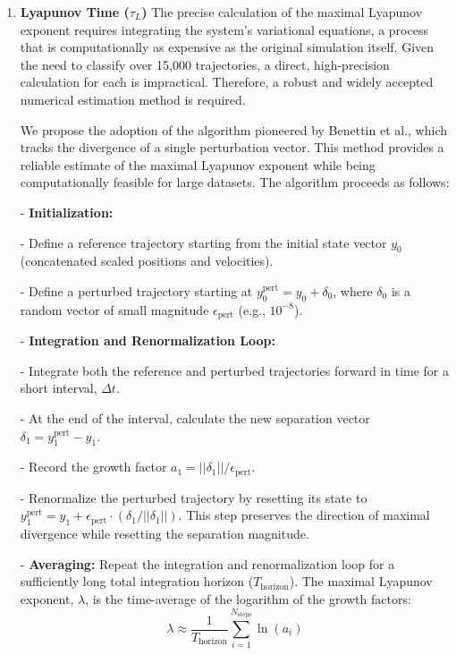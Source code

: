 \begin{enumerate}
- \textbf{Calculate Normalized Ratio:} The final dimensionless ratio is then $L_{\text{norm}} = L / L_{\max}$.

    This approach correctly captures the physical intuition that for a fixed energy, maximum angular momentum corresponds to circular motion, where kinetic energy is maximized at the largest stable separation.

    \item \textbf{Lyapunov Time ($\tau_L$)}
    The precise calculation of the maximal Lyapunov exponent requires integrating the system's variational equations, a process that is computationally as expensive as the original simulation itself. Given the need to classify over 15,000 trajectories, a direct, high-precision calculation for each is impractical. Therefore, a robust and widely accepted numerical estimation method is required.

    We propose the adoption of the algorithm pioneered by Benettin et al., which tracks the divergence of a single perturbation vector. This method provides a reliable estimate of the maximal Lyapunov exponent while being computationally feasible for large datasets. The algorithm proceeds as follows:


- \textbf{Initialization:}


- Define a reference trajectory starting from the initial state vector $y_0$ (concatenated scaled positions and velocities).

- Define a perturbed trajectory starting at $y_0^{\text{pert}} = y_0 + \delta_0$, where $\delta_0$ is a random vector of small magnitude $\epsilon_{\text{pert}}$ (e.g., $10^{-8}$).


- \textbf{Integration and Renormalization Loop:}


- Integrate both the reference and perturbed trajectories forward in time for a short interval, $\Delta t$.

- At the end of the interval, calculate the new separation vector $\delta_1 = y_1^{\text{pert}} - y_1$.

- Record the growth factor $a_1 = ||\delta_1|| / \epsilon_{\text{pert}}$.

- Renormalize the perturbed trajectory by resetting its state to $y_1^{\text{pert}} = y_1 + \epsilon_{\text{pert}} \cdot (\delta_1 / ||\delta_1||)$. This step preserves the direction of maximal divergence while resetting the separation magnitude.


- \textbf{Averaging:} Repeat the integration and renormalization loop for a sufficiently long total integration horizon ($T_{\text{horizon}}$). The maximal Lyapunov exponent, $\lambda$, is the time-average of the logarithm of the growth factors:
        \begin{equation}
            \lambda \approx \frac{1}{T_{\text{horizon}}} \sum_{i=1}^{N_{\text{steps}}} \ln(a_i)
        \end{equation}


\end{enumerate}
